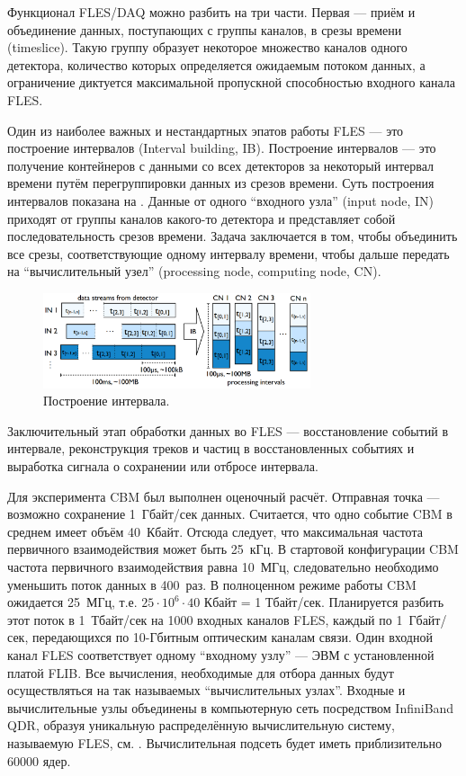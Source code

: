 Функционал FLES/DAQ можно разбить на три части. Первая --- приём и объединение данных, поступающих с группы каналов, в срезы времени (timeslice). Такую группу образует некоторое множество каналов одного детектора, количество которых определяется ожидаемым потоком данных, а ограничение диктуется максимальной пропускной способностью входного канала FLES.

Один из наиболее важных и нестандартных эпатов работы FLES --- это построение интервалов (Interval building, IB). Построение интервалов --- это получение контейнеров с данными со всех детекторов за некоторый интервал времени путём перегруппировки данных из срезов времени. Суть построения интервалов показана на . Данные от одного ``входного узла'' (input node, IN) приходят от группы каналов какого-то детектора и представляет собой последовательность срезов времени. Задача заключается в том, чтобы объединить все срезы, соответствующие одному интервалу времени, чтобы дальше передать на ``вычислительный узел'' (processing node, computing node, CN).

\begin{figure}[H]
\centering
\includegraphics[width=0.7\textwidth]{pictures/Interval_building.png}
\caption{Построение интервала.}
\label{fig:IntervalBuilding}
\end{figure}

Заключительный этап обработки данных во FLES --- восстановление событий в интервале, реконструкция треков и частиц в восстановленных событиях и выработка сигнала о сохранении или отбросе интервала.

Для эксперимента CBM был выполнен оценочный расчёт. Отправная точка --- возможно сохранение 1~Гбайт/сек данных. Считается, что одно событие CBM в среднем имеет объём 40~Кбайт. Отсюда следует, что максимальная частота первичного взаимодействия может быть 25~кГц. В стартовой конфигурации CBM частота первичного взаимодействия равна 10~МГц, следовательно необходимо уменьшить поток данных в 400~раз. В полноценном режиме работы CBM ожидается 25~МГц, т.е. $ 25 \cdot 10^{6} \cdot 40 $ Кбайт = 1 Тбайт/сек. Планируется разбить этот поток в 1~Тбайт/сек на 1000 входных каналов FLES, каждый по 1~Гбайт/сек, передающихся по 10-Гбитным оптическим каналам связи. Один входной канал FLES соответствует одному ``входному узлу'' --- ЭВМ с установленной платой FLIB. Все вычисления, необходимые для отбора данных будут осуществляться на так называемых ``вычислительных узлах''. Входные и вычислительные узлы объединены в компьютерную сеть посредством InfiniBand QDR, образуя уникальную распределённую вычислительную систему, называемую FLES, см. . Вычислительная подсеть будет иметь приблизительно 60000 ядер.

